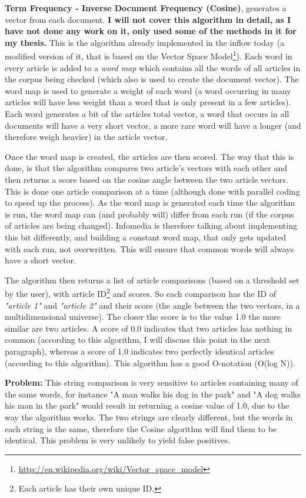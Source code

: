 \textbf{Term Frequency - Inverse Document Frequency\cite{WikiTFIDF} (Cosine)}, generates a vector from each document. \textbf{I will not cover this algorithm in detail, as I have not done any work on it, only used some of the methods in it for my thesis.} This is the algorithm already implemented in the inflow today (a modified version of it, that is based on the Vector Space Model\footnote{\url{http://en.wikipedia.org/wiki/Vector_space_model}}). Each word in every article is added to a \textit{word map} which contains all the words of all articles in the corpus being checked (which also is used to create the document vector). The word map is used to generate a weight of each word (a word occurring in many articles will have less weight than a word that is only present in a few articles). Each word generates a bit of the articles total vector, a word that occurs in all documents will have a very short vector, a more rare word will have a longer (and therefore weigh heavier) in the article vector.

Once the word map is created, the articles are then scored. The way that this is done, is that the algorithm compares two article's vectors with each other and then returns a score based on the cosine angle between the two article vectors. This is done one article comparison at a time (although done with parallel coding to speed up the process). As the word map is generated each time the algorithm is run, the word map can (and probably will) differ from each run (if the corpus of articles are being changed). Infomedia is therefore talking about implementing this bit differently, and building a constant word map, that only gets updated with each run, not overwritten. This will ensure that common words will always have a short vector.

The algorithm then returns a list of article comparisons (based on a threshold set by the user), with article ID\footnote{Each article has their own unique ID.} and scores. So each comparison has the ID of \textit{"article 1"} and \textit{"article 2"} and their score (the angle between the two vectors, in a multidimensional universe). The closer the score is to the value 1.0 the more similar are two articles. A score of 0.0 indicates that two articles has nothing in common (according to this algorithm, I will discuss this point in the next paragraph), whereas a score of 1.0 indicates two perfectly identical articles (according to this algorithm). This algorithm has a good O-notation (O(log N)).

\textbf{Problem:} \label{CosineProblem} This string comparison is very sensitive to articles containing many of the same words, for instance "A man walks his dog in the park" and "A dog walks his man in the park" would result in returning a cosine value of 1.0, due to the way the algorithm works. The two strings are clearly different, but the words in each string is the same, therefore the Cosine algorithm will find them to be identical. This problem is very unlikely to yield false positives.

